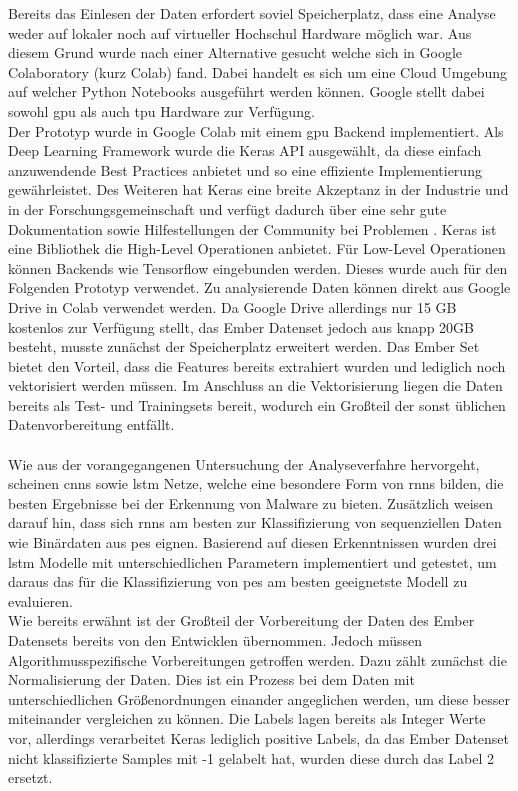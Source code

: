 \documentclass[
    12pt, %
    DIV10,
    ngerman, %
    a4paper, %
    oneside, %
    titlepage, %
    parskip=half, %
    headings=normal, %
    listof=totoc, %
    bibliography=totoc, %
    index=totoc, %
    captions=tableheading, %
    final %
]{scrreprt}
\begin{document}
Bereits das Einlesen der Daten erfordert soviel Speicherplatz, dass eine Analyse weder auf lokaler noch auf virtueller Hochschul Hardware möglich war. 
Aus diesem Grund wurde nach einer Alternative gesucht welche sich in Google Colaboratory (kurz Colab) fand. Dabei handelt es sich um eine Cloud Umgebung auf welcher Python Notebooks ausgeführt werden können. Google stellt dabei sowohl \ac{gpu} als auch \ac{tpu} Hardware zur Verfügung.\\
Der Prototyp wurde in Google Colab mit einem \ac{gpu} Backend implementiert. Als Deep Learning Framework wurde die Keras API ausgewählt, da diese einfach anzuwendende Best Practices anbietet und so eine effiziente Implementierung gewährleistet. Des Weiteren hat Keras eine breite Akzeptanz in der Industrie und in der Forschungsgemeinschaft und verfügt dadurch über eine sehr gute Dokumentation sowie Hilfestellungen der Community bei Problemen \parencite{Keras}. Keras ist eine Bibliothek die High-Level Operationen anbietet. Für Low-Level Operationen können Backends wie Tensorflow eingebunden werden. Dieses wurde auch für den Folgenden Prototyp verwendet. Zu analysierende Daten können direkt aus Google Drive in Colab verwendet werden. Da Google Drive allerdings nur 15 GB kostenlos zur Verfügung stellt, das Ember Datenset jedoch aus knapp 20GB besteht, musste zunächst der Speicherplatz erweitert werden. 
Das Ember Set bietet den Vorteil, dass die Features bereits extrahiert wurden und lediglich noch vektorisiert werden müssen. Im Anschluss an die Vektorisierung liegen die Daten bereits als Test- und Trainingsets bereit, wodurch ein Großteil der sonst üblichen Datenvorbereitung entfällt.\\\\
Wie aus der vorangegangenen Untersuchung der Analyseverfahre hervorgeht, scheinen \ac{cnns} sowie \ac{lstm} Netze, welche eine besondere Form von \ac{rnns} bilden, die besten Ergebnisse bei der Erkennung von Malware zu bieten. Zusätzlich weisen \textcite{JoshuaSaxe2018} darauf hin, dass sich \ac{rnns} am besten zur Klassifizierung von sequenziellen Daten wie Binärdaten aus \ac{pes} eignen. Basierend auf diesen Erkenntnissen wurden drei \ac{lstm} Modelle mit unterschiedlichen Parametern implementiert und getestet, um daraus das für die Klassifizierung von \ac{pes} am besten geeignetste Modell zu evaluieren.\\
Wie bereits erwähnt ist der Großteil der Vorbereitung der Daten des Ember Datensets bereits von den Entwicklen übernommen. Jedoch müssen Algorithmusspezifische Vorbereitungen getroffen werden. Dazu zählt zunächst die Normalisierung der Daten. Dies ist ein Prozess bei dem Daten mit unterschiedlichen Größenordnungen einander angeglichen werden, um diese besser miteinander vergleichen zu können. Die Labels lagen bereits als Integer Werte vor, allerdings verarbeitet Keras lediglich positive Labels, da das Ember Datenset nicht klassifizierte Samples mit -1 gelabelt hat, wurden diese durch das Label 2 ersetzt. \\
\end{document}
